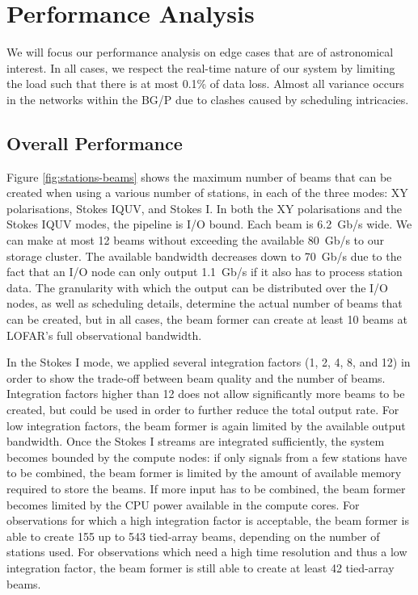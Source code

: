 \documentclass{llncs}
\begin{document}
\section{Performance Analysis}

We will focus our performance analysis on edge cases that are of astronomical interest. In all cases, we respect the real-time nature of our system by limiting the load such that there is at most 0.1\% of data loss. Almost all variance occurs in the networks within the BG/P due to clashes caused by scheduling intricacies.

\subsection{Overall Performance}

Figure \ref{fig:stations-beams} shows the maximum number of beams that can be created when using a various number of stations, in each of the three modes: XY polarisations, Stokes IQUV, and Stokes I. In both the XY polarisations and the Stokes IQUV modes, the pipeline is I/O bound. Each beam is 6.2~Gb/s wide. We can make at most 12 beams without exceeding the available 80~Gb/s to our storage cluster. The available bandwidth decreases down to 70~Gb/s due to the fact that an I/O node can only output 1.1~Gb/s if it also has to process station data. The granularity with which the output can be distributed over the I/O nodes, as well as scheduling details, determine the actual number of beams that can be created, but in all cases, the beam former can create at least 10 beams at LOFAR's full observational bandwidth.

In the Stokes I mode, we applied several integration factors (1, 2, 4, 8, and 12) in order to show the trade-off between beam quality and the number of beams. Integration factors higher than 12 does not allow significantly more beams to be created, but could be used in order to further reduce the total output rate. For low integration factors, the beam former is again limited by the available output bandwidth. Once the Stokes I streams are integrated sufficiently, the system becomes bounded by the compute nodes: if only signals from a few stations have to be combined, the beam former is limited by the amount of available memory required to store the beams. If more input has to be combined, the beam former becomes limited by the CPU power available in the compute cores. For observations for which a high integration factor is acceptable, the beam former is able to create 155 up to 543 tied-array beams, depending on the number of stations used. For observations which need a high time resolution and thus a low integration factor, the beam former is still able to create at least 42 tied-array beams.
\end{document}

